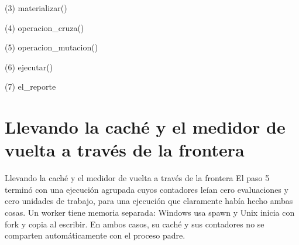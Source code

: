 \begin{frame}[fragile]{(3) materializar()}

\end{frame}

\begin{frame}[fragile]{(4) operacion\_cruza()}

\end{frame}

\begin{frame}[fragile]{(5) operacion\_mutacion()}

\end{frame}

\begin{frame}[fragile]{(6) ejecutar()}

\end{frame}

\begin{frame}[fragile]{(7) el\_reporte}

\end{frame}


\section{Llevando la caché y el medidor de vuelta a través de la frontera}

\begin{frame}{Llevando la caché y el medidor de vuelta a través de la frontera}
El paso 5 terminó con una ejecución agrupada cuyos contadores leían cero evaluaciones y cero
unidades de trabajo, para una ejecución que claramente había hecho ambas cosas.
Un worker tiene memoria separada: Windows usa spawn y Unix inicia con fork y
copia al escribir. En ambos casos, su caché y sus contadores no se comparten
automáticamente con el proceso padre.
\end{frame}

